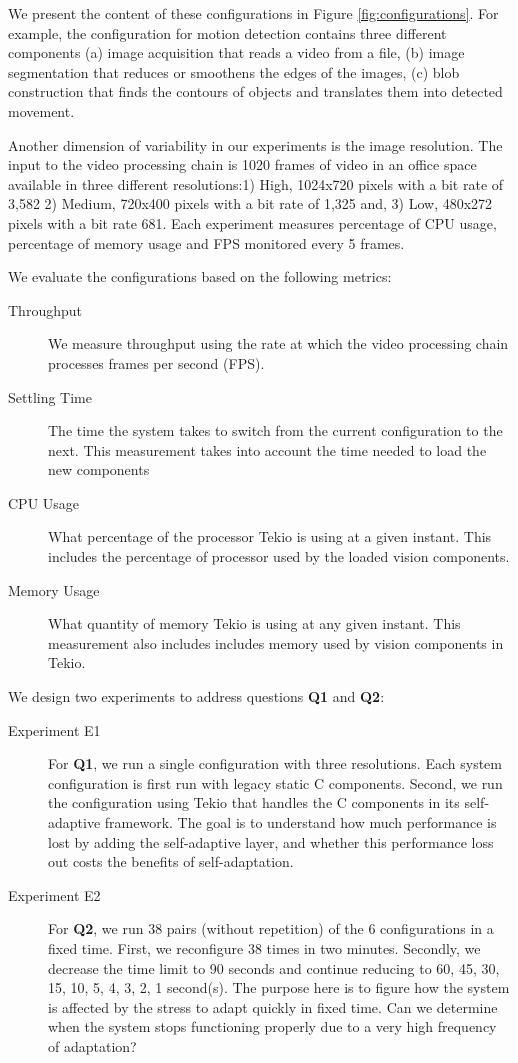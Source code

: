 We present the content of these configurations in Figure \ref{fig:configurations}. For example, the configuration for motion detection contains three different components (a) image acquisition that reads a video from a file, (b) image segmentation that reduces or smoothens the edges of the images, (c) blob construction  that finds the contours of objects and translates them into detected movement. 

Another dimension of variability in our experiments is the image resolution. The input to the video processing chain is 1020 frames of video in an office space available in three different resolutions:1) High, 1024x720 pixels with a bit rate of 3,582 2) Medium, 720x400 pixels with a bit rate of 1,325 and, 3) Low, 480x272 pixels with a bit rate 681. Each experiment measures percentage of CPU usage, percentage of memory usage and FPS monitored every 5 frames. 

We evaluate the configurations based on the following metrics:
	\begin{description}
		\item[Throughput] We measure throughput using the rate at which the video processing chain processes frames per second (FPS).
		\item[Settling Time] The time the system takes to switch from the current configuration to the next. This measurement takes into account the time needed to load the new components
		\item[CPU Usage] What percentage of the processor Tekio is using at a given instant. This includes the percentage of processor used by the loaded vision components.
		\item[Memory Usage] What quantity of memory Tekio is using at any given instant. This measurement also includes includes memory used by vision components in Tekio.
	\end{description}

We design two experiments to address questions \textbf{Q1} and \textbf{Q2}:

\begin{description}	
		\item[Experiment E1] For \textbf{Q1}, we run a single configuration with three resolutions. Each system configuration is first run  with legacy static C components. Second, we run the configuration using  Tekio that handles the C components in its self-adaptive framework. The goal is to understand how much performance is lost by adding the self-adaptive layer, and whether this performance loss out costs the benefits of self-adaptation.
		
		\item[Experiment E2] For \textbf{Q2}, we run 38 pairs (without repetition) of the 6 configurations in a fixed time. First, we reconfigure 38 times in two minutes.	Secondly, we  decrease the time limit to 90 seconds and continue reducing to 60, 45, 30, 15, 10, 5, 4, 3, 2, 1 second(s). The purpose here is to figure how the system is affected by the stress to adapt quickly in fixed time. Can we determine when the system stops functioning properly due to a very high frequency of adaptation?
		
	\end{description}
	
